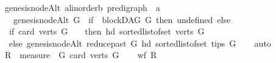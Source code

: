 \begin{isabellebody}
\ genesis{\isacharunderscore}{\kern0pt}nodeAlt{\isacharcolon}{\kern0pt}{\isacharcolon}{\kern0pt}\ {\isachardoublequoteopen}{\isacharparenleft}{\kern0pt}{\isacharprime}{\kern0pt}a{\isacharcolon}{\kern0pt}{\isacharcolon}{\kern0pt}linorder{\isacharcomma}{\kern0pt}{\isacharprime}{\kern0pt}b{\isacharparenright}{\kern0pt}\ pre{\isacharunderscore}{\kern0pt}digraph\ {\isasymRightarrow}\ {\isacharprime}{\kern0pt}a{\isachardoublequoteclose}\isanewline
\ \ \ {\isachardoublequoteopen}genesis{\isacharunderscore}{\kern0pt}nodeAlt\ G\ {\isacharequal}{\kern0pt}\ {\isacharparenleft}{\kern0pt}if\ {\isacharparenleft}{\kern0pt}{\isasymnot}\ blockDAG\ G{\isacharparenright}{\kern0pt}\ then\ undefined\ else\ \isanewline
\ \ if\ {\isacharparenleft}{\kern0pt}card\ {\isacharparenleft}{\kern0pt}verts\ G\ {\isacharparenright}{\kern0pt}\ {\isacharequal}{\kern0pt}\ {}{\isacharparenright}{\kern0pt}\ then\ {\isacharparenleft}{\kern0pt}hd\ {\isacharparenleft}{\kern0pt}sorted{\isacharunderscore}{\kern0pt}list{\isacharunderscore}{\kern0pt}of{\isacharunderscore}{\kern0pt}set\ {\isacharparenleft}{\kern0pt}verts\ G{\isacharparenright}{\kern0pt}{\isacharparenright}{\kern0pt}{\isacharparenright}{\kern0pt}\isanewline
\ \ else\ genesis{\isacharunderscore}{\kern0pt}nodeAlt\ {\isacharparenleft}{\kern0pt}reduce{\isacharunderscore}{\kern0pt}past\ G\ {\isacharparenleft}{\kern0pt}{\isacharparenleft}{\kern0pt}hd\ {\isacharparenleft}{\kern0pt}sorted{\isacharunderscore}{\kern0pt}list{\isacharunderscore}{\kern0pt}of{\isacharunderscore}{\kern0pt}set\ {\isacharparenleft}{\kern0pt}tips\ G{\isacharparenright}{\kern0pt}{\isacharparenright}{\kern0pt}{\isacharparenright}{\kern0pt}{\isacharparenright}{\kern0pt}{\isacharparenright}{\kern0pt}{\isacharparenright}{\kern0pt}{\isachardoublequoteclose}\isanewline
%
\isadelimproof
\ \ %
\endisadelimproof
%
\isatagproof
{}\isamarkupfalse%
\ auto%
\endisatagproof
{\isafoldproof}%
%
\isadelimproof
\ \isanewline
%
\endisadelimproof
{}\isamarkupfalse%
%
\isadelimproof
\ %
\endisadelimproof
%
\isatagproof
{}\isamarkupfalse%
\ \isanewline
\ \ \isamarkupfalse%
\ {\isacharquery}{\kern0pt}R\ {\isacharequal}{\kern0pt}\ {\isachardoublequoteopen}measure\ {\isacharparenleft}{\kern0pt}\ {\isasymlambda}G{\isachardot}{\kern0pt}\ {\isacharparenleft}{\kern0pt}card\ {\isacharparenleft}{\kern0pt}verts\ G{\isacharparenright}{\kern0pt}{\isacharparenright}{\kern0pt}{\isacharparenright}{\kern0pt}{\isachardoublequoteclose}\isanewline
\ \ \isamarkupfalse%
\ {\isachardoublequoteopen}wf\ {\isacharquery}{\kern0pt}R{\isachardoublequoteclose}\ \isamarkupfalse%

\end{isabellebody}
